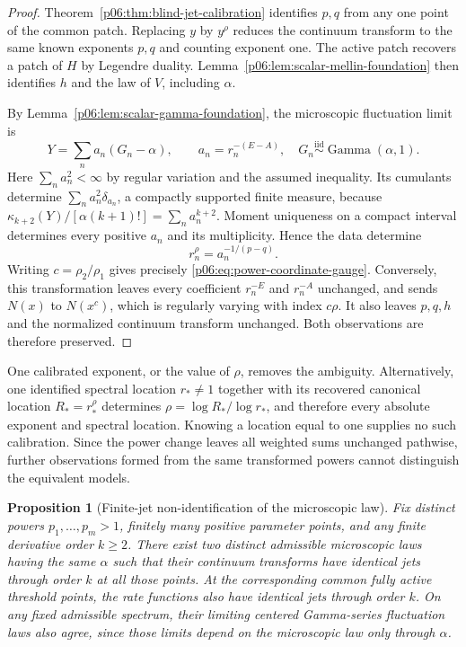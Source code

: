 \documentclass[11pt,letterpaper]{article}
\newtheorem{proposition}[theorem]{Proposition}
\theoremstyle{definition}
\theoremstyle{remark}
\newcommand{\1}{\mathbf 1}
\begin{document}
\begin{proof}
Theorem~\ref{p06:thm:blind-jet-calibration} identifies $p,q$ from any one
point of the common patch.  Replacing $y$ by $y^\rho$ reduces the
continuum transform to the same known exponents $p,q$ and counting
exponent one.  The active patch recovers a patch of $H$ by Legendre
duality.  Lemma~\ref{p06:lem:scalar-mellin-foundation} then identifies
$h$ and the law of $V$, including $\alpha$.

By Lemma~\ref{p06:lem:scalar-gamma-foundation}, the microscopic
fluctuation limit is
\[
 Y=\sum_n a_n(G_n-\alpha),\qquad
 a_n=r_n^{-(E-A)},\quad
 G_n\overset{\mathrm{iid}}{\sim}\operatorname{Gamma}(\alpha,1).
\]
Here $\sum_n a_n^2<\infty$ by regular variation and the assumed
inequality.  Its cumulants determine
$\sum_n a_n^2\delta_{a_n}$, a compactly supported finite measure,
because
$\kappa_{k+2}(Y)/[\alpha(k+1)!]=\sum_n a_n^{k+2}$.
Moment uniqueness on a compact interval determines every positive
$a_n$ and its multiplicity.  Hence the data determine
\[
 r_n^\rho=a_n^{-1/(p-q)}.
\]
Writing $c=\rho_2/\rho_1$ gives precisely
\eqref{p06:eq:power-coordinate-gauge}.  Conversely, this transformation
leaves every coefficient $r_n^{-E}$ and $r_n^{-A}$ unchanged,
and sends $N(x)$ to $N(x^c)$, which is regularly varying with index
$c\rho$.  It also leaves $p,q,h$ and the normalized continuum
transform unchanged.  Both observations are therefore preserved.
\end{proof}

One calibrated exponent, or the value of $\rho$, removes the ambiguity.
Alternatively, one identified spectral location $r_*\ne1$ together
with its recovered canonical location $R_*=r_*^\rho$ determines
$\rho=\log R_*/\log r_*$, and therefore every absolute exponent and
spectral location.  Knowing a location equal to one supplies no such
calibration.  Since the power change leaves all weighted sums unchanged
pathwise, further observations formed from the same transformed powers
cannot distinguish the equivalent models.

\begin{proposition}[Finite-jet non-identification of the microscopic law]
\label{p06:prop:finite-jets-insufficient}
Fix distinct powers $p_1,\ldots,p_m>1$, finitely many positive parameter
points, and any finite derivative order $k\ge2$.  There exist two
distinct admissible microscopic laws having the same $\alpha$ such that
their continuum transforms have identical jets through order $k$ at
all those points.  At the corresponding common fully active threshold
points, the rate functions also have identical jets through order $k$.
On any fixed admissible spectrum, their limiting centered Gamma-series
fluctuation laws also agree, since those limits depend on the
microscopic law only through $\alpha$.
\end{proposition}
\end{document}
